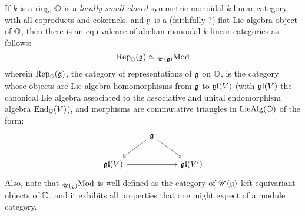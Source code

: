             \begin{theorem}
                If $k$ is a ring, $\mathbb{O}$ is a \textit{locally small} \textit{closed} symmetric monoidal $k$-linear category with all coproducts and cokernels, and $\mathfrak{g}$ is a (faithfully ?) flat Lie algebra object of $\mathbb{O}$, then there is an equivalence of abelian monoidal $k$-linear categories as follows:
                    $$\mathrm{Rep}_{\mathbb{O}}(\mathfrak{g}) \simeq {}_{\mathscr{U}(\mathfrak{g})}\mathrm{Mod}$$
                wherein $\mathrm{Rep}_{\mathbb{O}}(\mathfrak{g})$, the category of representations of $\mathfrak{g}$ on $\mathbb{O}$, is the category whose objects are Lie algebra homomorphisms from $\mathfrak{g}$ to $\mathfrak{gl}(V)$ (with $\mathfrak{gl}(V)$ the canonical Lie algebra associated to the associative and unital endomorphism algebra $\mathrm{End}_{\mathbb{O}}(V)$), and morphisms are commutative triangles in $\mathrm{Lie}\mathrm{Alg}(\mathbb{O})$ of the form:
                    $$
                        \begin{tikzcd}
                        	& {\g} \\
                        	{\frakgl(V)} && {\frakgl(V')}
                        	\arrow[from=2-1, to=2-3]
                        	\arrow[from=1-2, to=2-1]
                        	\arrow[from=1-2, to=2-3]
                        \end{tikzcd}
                    $$
                Also, note that ${}_{\mathscr{U}(\mathfrak{g})}\mathrm{Mod}$ is \href{https://ncatlab.org/nlab/show/module+over+a+monoid}{\underline{well-defined}} as the category of $\mathscr{U}(\mathfrak{g})$-left-equivariant objects of $\mathbb{O}$, and it exhibits all properties that one might expect of a module category.
            \end{theorem}

